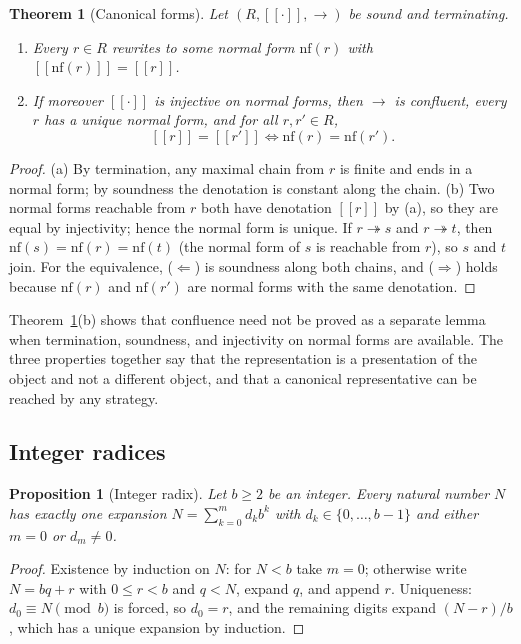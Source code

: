 \documentclass[11pt]{article}
\newcommand{\sem}[1]{[\![#1]\!]}
\theoremstyle{definition}
\theoremstyle{plain}
\newtheorem{theorem}[definition]{Theorem}
\newtheorem{proposition}[definition]{Proposition}
\theoremstyle{remark}
\begin{document}
\begin{theorem}[Canonical forms]\label{thm:canon}
Let $(R,\sem{\cdot},\to)$ be sound and terminating.
\begin{enumerate}[label=(\alph*)]
\item Every $r\in R$ rewrites to some normal form $\mathrm{nf}(r)$ with $\sem{\mathrm{nf}(r)}=\sem r$.
\item If moreover $\sem{\cdot}$ is injective on normal forms, then $\to$ is confluent, every $r$ has a \emph{unique} normal form, and for all $r,r'\in R$,
\[
\sem r=\sem{r'}\iff\mathrm{nf}(r)=\mathrm{nf}(r').
\]
\end{enumerate}
\end{theorem}
\begin{proof}
(a) By termination, any maximal chain from $r$ is finite and ends in a normal form; by soundness the denotation is constant along the chain. (b) Two normal forms reachable from $r$ both have denotation $\sem r$ by (a), so they are equal by injectivity; hence the normal form is unique. If $r\twoheadrightarrow s$ and $r\twoheadrightarrow t$, then $\mathrm{nf}(s)=\mathrm{nf}(r)=\mathrm{nf}(t)$ (the normal form of $s$ is reachable from $r$), so $s$ and $t$ join. For the equivalence, ($\Leftarrow$) is soundness along both chains, and ($\Rightarrow$) holds because $\mathrm{nf}(r)$ and $\mathrm{nf}(r')$ are normal forms with the same denotation.
\end{proof}

Theorem~\ref{thm:canon}(b) shows that confluence need not be proved as a separate lemma when termination, soundness, and injectivity on normal forms are available. The three properties together say that the representation is a presentation of the object and not a different object, and that a canonical representative can be reached by any strategy.

\subsection{Integer radices}

\begin{proposition}[Integer radix]\label{prop:intradix}
Let $b\ge2$ be an integer. Every natural number $N$ has exactly one expansion $N=\sum_{k=0}^m d_kb^k$ with $d_k\in\{0,\dots,b-1\}$ and either $m=0$ or $d_m\neq0$.
\end{proposition}
\begin{proof}
Existence by induction on $N$: for $N<b$ take $m=0$; otherwise write $N=bq+r$ with $0\le r<b$ and $q<N$, expand $q$, and append $r$. Uniqueness: $d_0\equiv N\pmod b$ is forced, so $d_0=r$, and the remaining digits expand $(N-r)/b$, which has a unique expansion by induction.
\end{proof}
\end{document}
